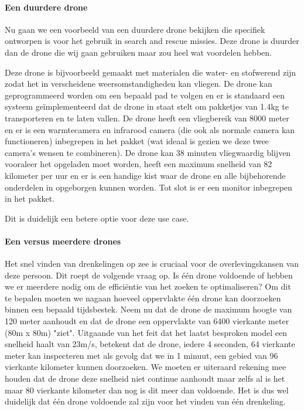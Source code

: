 \paragraph{Een duurdere drone}

Nu gaan we een voorbeeld van een duurdere drone bekijken die specifiek ontworpen is voor het gebruik in search and rescue missies. Deze drone is duurder dan de drone die wij gaan gebruiken maar zou heel wat voordelen hebben. \autocite{Industrial}

Deze drone is bijvoorbeeld gemaakt met materialen die water- en stofwerend zijn zodat het in verscheidene weersomstandigheden kan vliegen. De drone kan geprogrammeerd worden om een bepaald pad te volgen en er is standaard een systeem geïmplementeerd dat de drone in staat stelt om pakketjes van 1.4kg te transporteren en te laten vallen. De drone heeft een vliegbereik van 8000 meter en er is een warmtecamera en infrarood camera (die ook als normale camera kan functioneren) inbegrepen in het pakket (wat ideaal is gezien we deze twee camera's wensen te combineren). De drone kan 38 minuten vliegwaardig blijven vooraleer het opgeladen moet worden, heeft een maximum snelheid van 82 kilometer per uur en er is een handige kist waar de drone en alle bijbehorende onderdelen in opgeborgen kunnen worden. Tot slot is er een monitor inbegrepen in het pakket.

Dit is duidelijk een betere optie voor deze use case.

\paragraph{Een versus meerdere drones}

Het snel vinden van drenkelingen op zee is cruciaal voor de overlevingskansen van deze persoon. Dit roept de volgende vraag op. Is één drone voldoende of hebben we er meerdere nodig om de efficiëntie van het zoeken te optimaliseren? Om dit te bepalen moeten we nagaan hoeveel oppervlakte één drone kan doorzoeken binnen een bepaald tijdsbestek. Neem nu dat de drone de maximum hoogte van 120 meter aanhoudt en dat de drone een oppervlakte van 6400 vierkante meter (80m x 80m) "ziet". Uitgaande van het feit dat het laatst besproken model een snelheid haalt van 23m/s, betekent dat de drone, iedere 4 seconden, 64 vierkante meter kan inspecteren met als gevolg dat we in 1 minuut, een gebied van 96 vierkante kilometer kunnen doorzoeken. We moeten er uiteraard rekening mee houden dat de drone deze snelheid niet continue aanhoudt maar zelfs al is het maar 80 vierkante kilometer dan nog is dit meer dan voldoende. Het is dus wel duidelijk dat één drone voldoende zal zijn voor het vinden van één drenkeling.

